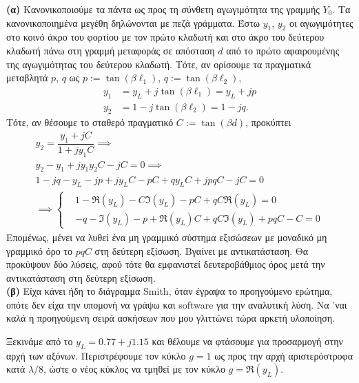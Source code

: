 \documentclass[12pt]{article}
\begin{document}
\textbf{(α)} Κανονικοποιούμε τα πάντα ως προς τη σύνθετη αγωγιμότητα της γραμμής \(Y_0\). Τα κανονικοποιημένα μεγέθη δηλώνονται με πεζά γράμματα. 
Έστω \(y_1 \), \(y_2 \) οι αγωγιμότητες στο κοινό άκρο του φορτίου με τον πρώτο κλαδωτή και στο άκρο του δεύτερου κλαδωτή πάνω στη γραμμή μεταφοράς σε απόσταση \(d\) από το πρώτο αφαιρουμένης της αγωγιμότητας του δεύτερου κλαδωτή. 
Τότε, αν  ορίσουμε τα πραγματικά μεταβλητά \(p\), \(q \) ως \(p := \tan(\beta\ell_1)\), \(q := \tan(\beta\ell_2)\), 
\begin{align}
    y_1 &= y_L + j\tan(\beta \ell_1) = y_L + jp\\
    y_2 &= 1 - j\tan(\beta \ell_2) = 1 - jq.
\end{align}
Τότε, αν θέσουμε το σταθερό πραγματικό \(C := \tan(\beta d)\), προκύπτει 
\begin{gather}
    y_2 = \dfrac{y_1 + jC}{1 + jy_1 C} \implies \\
    y_2 - y_1 + jy_1y_2C - jC = 0 \implies \\ 
    1 - jq - y_L - jp + jy_LC - pC + qy_LC + jpqC - jC= 0 \\ \implies
    \left\{   \begin{aligned}
        & 1 - \Re(y_L) - C\Im(y_L) - pC + qC\Re(y_L) = 0 \\
        & -q - \Im(y_L) - p + \Re(y_L)C + qC\Im(y_L) + pqC - C = 0 
    \end{aligned}
    \right.
\end{gather}
Επομένως, μένει να λυθεί ένα μη γραμμικό σύστημα εξισώσεων με μοναδικό μη γραμμικό όρο το \(pqC\) στη δεύτερη εξίσωση. Βγαίνει με αντικατάσταση. Θα προκύψουν δύο λύσεις, αφού τότε θα εμφανιστεί δευτεροβάθμιος όρος μετά την αντικατάσταση στη δεύτερη εξίσωση. \\

\textbf{(β)} Είχα κάνει ήδη το διάγραμμα Smith, όταν έγραψα το προηγούμενο ερώτημα, οπότε δεν είχα την υπομονή να γράψω και software για την αναλυτική λύση. Να 'ναι καλά η προηγούμενη σειρά ασκήσεων που μου γλιττώνει τώρα αρκετή υλοποίηση. 

Ξεκινάμε από το \(y_L = 0.77 + j1.15\) και θέλουμε να φτάσουμε για προσαρμογή στην αρχή των αξόνων. Περιστρέφουμε τον κύκλο \(g = 1\) ως προς την αρχή αριστερόστροφα κατά \(\lambda/8\), ώστε ο νέος κύκλος να τμηθεί με τον κύκλο \(g = \Re(y_L)\). 
\end{document}
